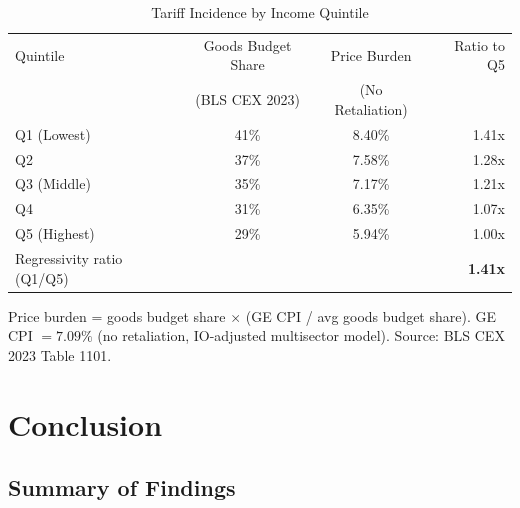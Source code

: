 \documentclass[12pt]{article}
\begin{document}
\begin{table}[H]
\centering
\caption{Tariff Incidence by Income Quintile}
\label{tab:quintile}
\begin{tabular}{lccr}
\toprule
Quintile & Goods Budget Share & Price Burden & Ratio to Q5 \\
         & (BLS CEX 2023) & (No Retaliation) & \\
\midrule
Q1 (Lowest)  & 41\% & 8.40\% & 1.41x \\
Q2           & 37\% & 7.58\% & 1.28x \\
Q3 (Middle)  & 35\% & 7.17\% & 1.21x \\
Q4           & 31\% & 6.35\% & 1.07x \\
Q5 (Highest) & 29\% & 5.94\% & 1.00x \\
\midrule
Regressivity ratio (Q1/Q5) & & & \textbf{1.41x} \\
\bottomrule
\end{tabular}
\begin{tablenotes}
\small
\item Price burden = goods budget share $\times$ (GE CPI / avg goods budget share).
GE CPI $= 7.09\%$ (no retaliation, IO-adjusted multisector model).
Source: BLS CEX 2023 Table 1101.
\end{tablenotes}
\end{table}

\section{Conclusion}

\subsection{Summary of Findings}
\end{document}
